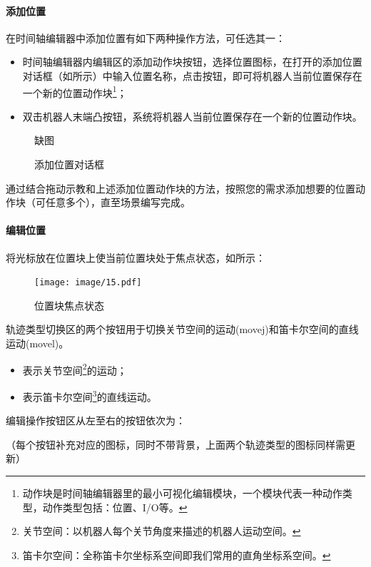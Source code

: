 \paragraph{添加位置}
在时间轴编辑器中添加位置有如下两种操作方法，可任选其一：
\begin{itemize}
	\item 时间轴编辑器内编辑区的添加动作块按钮，选择位置图标，在打开的添加位置对话框（如所示）中输入位置名称，点击按钮，即可将机器人当前位置保存在一个新的位置动作块\footnote{动作块是时间轴编辑器里的最小可视化编辑模块，一个模块代表一种动作类型，动作类型包括：位置、I/O等。}；
	\item 双击机器人末端凸按钮，系统将机器人当前位置保存在一个新的位置动作块。
\end{itemize}

\begin{figure}[ht]
	\centering
	\color{red}缺图
	\caption{添加位置对话框}
	\label{fig:添加位置对话框}
\end{figure}

通过结合拖动示教和上述添加位置动作块的方法，按照您的需求添加想要的位置动作块（可任意多个），直至场景编写完成。

\paragraph{编辑位置}
\label{sec:编辑位置}
将光标放在位置块上使当前位置块处于焦点状态，如所示：

\begin{figure}[ht]
	\centering
	\texttt{[image: image/15.pdf]}
	\caption{位置块焦点状态}
	\label{fig:位置块焦点状态}
\end{figure}

轨迹类型切换区的两个按钮用于切换关节空间的运动(movej)和笛卡尔空间的直线运动(movel)。
\begin{itemize}
	\item[\icn{image/42.pdf}] 表示关节空间\footnote{关节空间：以机器人每个关节角度来描述的机器人运动空间。}的运动；
	\item[\icn{image/42.pdf}] 表示笛卡尔空间\footnote{笛卡尔空间：全称笛卡尔坐标系空间即我们常用的直角坐标系空间。}的直线运动。
\end{itemize}

编辑操作按钮区从左至右的按钮依次为：

{\color{red}（每个按钮补充对应的图标，同时不带背景，上面两个轨迹类型的图标同样需更新）}

